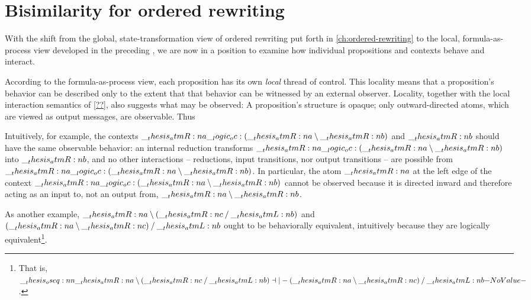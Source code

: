 \chapter{Bisimilarity for ordered rewriting}\label{ch:ordered-bisimilarity}

With the shift from the global, state-transformation view of ordered rewriting put forth in \cref{ch:ordered-rewriting} to the local, formula-as-process view developed in the preceding , we are now in a position to examine how individual propositions and contexts behave and interact.%

According to the formula-as-process view, each proposition has its own \emph{local} thread of control.
This locality means that a proposition's behavior can be described only to the extent that that behavior can be witnessed by an external observer.
Locality, together with the local interaction semantics of \cref{??}, also suggests what may be observed:
A proposition's structure is opaque; only outward-directed atoms, which are viewed as output messages, are observable.
Thus


Intuitively, for example, the contexts $\__thesis_atmR:n {a} \__logic_oc: (\__thesis_atmR:n {a} \mathbin { \setminus } \__thesis_atmR:n {b})$ and $\__thesis_atmR:n {b}$ should have the same observable behavior: an internal reduction transforms $\__thesis_atmR:n {a} \__logic_oc: (\__thesis_atmR:n {a} \mathbin { \setminus } \__thesis_atmR:n {b})$ into $\__thesis_atmR:n {b}$, and no other interactions -- reductions, input transitions, nor output transitions -- are possible from $\__thesis_atmR:n {a} \__logic_oc: (\__thesis_atmR:n {a} \mathbin { \setminus } \__thesis_atmR:n {b})$.
In particular, the atom $\__thesis_atmR:n {a}$ at the left edge of the context $\__thesis_atmR:n {a} \__logic_oc: (\__thesis_atmR:n {a} \mathbin { \setminus } \__thesis_atmR:n {b})$ cannot be observed because it is directed inward and therefore acting as an input to, not an output from, $\__thesis_atmR:n {a} \mathbin { \setminus } \__thesis_atmR:n {b}$.

As another example, $\__thesis_atmR:n {a} \mathbin { \setminus } (\__thesis_atmR:n {c} \mathbin { / } \__thesis_atmL:n {b})$ and $(\__thesis_atmR:n {a} \mathbin { \setminus } \__thesis_atmR:n {c}) \mathbin { / } \__thesis_atmL:n {b}$ ought to be behaviorally equivalent, intuitively because they are logically equivalent\footnote{That is, $\oseq{\atmR{a} \limp (\atmR{c} \pmir \atmL{b}) \dashv|- (\atmR{a} \limp \atmR{c}) \pmir \atmL{b}}$.}.

